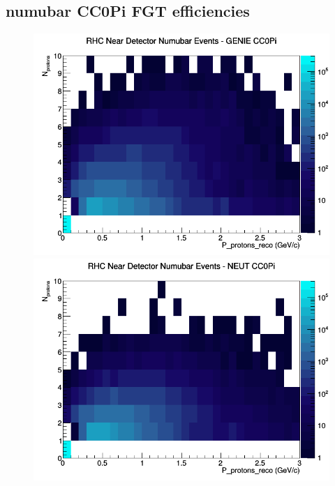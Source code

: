 \documentclass[12pt]{article}
\begin{document}
\subsection{numubar CC0Pi FGT efficiencies}
\begin{figure}[h]
\includegraphics[width=\linewidth]{eff_N_P/FGT/protons/CC0Pi_RHC_ND_numubar_N_P_GENIE.png}
\endminipage
{}
\includegraphics[width=\linewidth]{eff_N_P/FGT/protons/CC0Pi_RHC_ND_numubar_N_P_NEUT.png}
\endminipage
{}

\end{figure}
\end{document}
